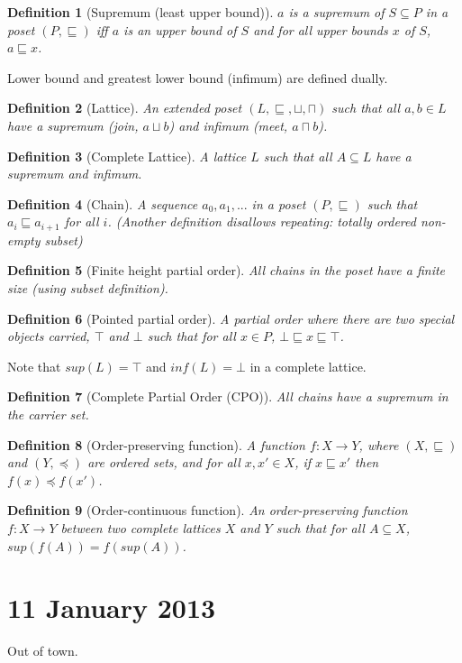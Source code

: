 \documentclass[11pt]{article}
\newtheorem{definition}{Definition}
\begin{document}
\begin{definition}[Supremum (least upper bound)]
$a$ is a supremum of $S \subseteq P$ in a poset $(P,
  \sqsubseteq)$ iff $a$ is an upper bound of $S$ and for all upper
  bounds $x$ of $S$, $a \sqsubseteq x$.
\end{definition}

Lower bound and greatest lower bound (infimum) are defined dually.

\begin{definition}[Lattice]
An extended poset $(L, \sqsubseteq, \sqcup, \sqcap)$ such that all
$a,b \in L$ have a supremum (join, $a \sqcup b$) and infimum (meet, $a
\sqcap b$).
\end{definition}

\begin{definition}[Complete Lattice]
A lattice $L$ such that all $A \subseteq
L$ have a supremum and infimum.
\end{definition}

\begin{definition}[Chain]
A sequence $a_0, a_1, ...$ in a poset $(P,
\sqsubseteq)$ such that $a_i \sqsubseteq a_{i+1}$ for all
$i$. (Another definition disallows repeating: totally ordered
non-empty subset)
\end{definition}

\begin{definition}[Finite height partial order]
All chains in the poset have a finite size (using subset definition).
\end{definition}

\begin{definition}[Pointed partial order]
A partial order where there are two special objects carried, $\top$ and $\bot$
such that for all $x \in P$, $\bot \sqsubseteq x \sqsubseteq \top$.
\end{definition}

Note that $sup(L) = \top$ and $inf(L) = \bot$ in a complete lattice.

\begin{definition}[Complete Partial Order (CPO)]
All chains have a supremum in the carrier set.
\end{definition}

\begin{definition}[Order-preserving function]
A function $f: X \to Y$, where $(X, \sqsubseteq)$ and $(Y, \preceq)$
are ordered sets, and for all $x,x' \in X$, if $x \sqsubseteq x'$ then
$f(x) \preceq f(x')$.
\end{definition}

\begin{definition}[Order-continuous function]
An order-preserving function $f : X \to Y$ between two complete
lattices $X$ and $Y$ such that for all $A \subseteq X$, $sup(f(A)) =
f(sup(A))$.
\end{definition}

\section{11 January 2013}
Out of town.
\end{document}
